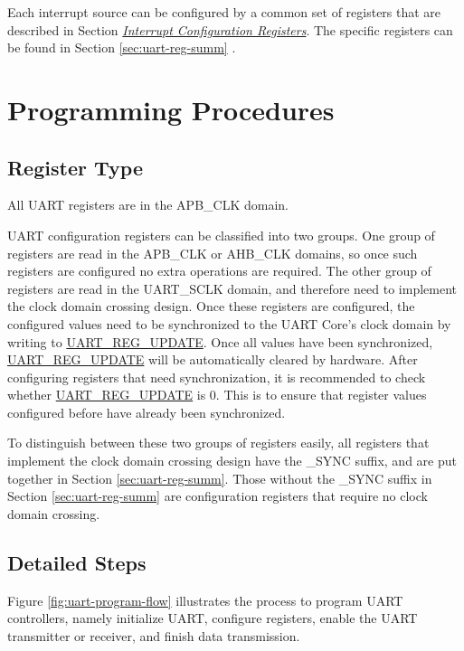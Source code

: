 \documentclass[main\_\_EN.tex]{subfiles}
\begin{document}
Each interrupt source can be configured by a common set of registers that are described in Section \hyperref[interrupt-config-registers]{\textit{Interrupt Configuration Registers}}. The specific registers can be found in Section \ref{sec:uart-reg-summ} \textit{}.


\section{Programming Procedures}\label{sec:uart-program}

\subsection{Register Type}

All UART registers are in the APB\_CLK domain.

UART configuration registers can be classified into two groups. One group of registers are read in the APB\_CLK or AHB\_CLK domains, so once such registers are configured no extra operations are required. The other group of registers are read in the UART\_SCLK domain, and therefore need to implement the clock domain crossing design. Once these registers are configured, the configured values need to be synchronized to the UART Core's clock domain by writing to \hyperref[fielddesc:UARTREGUPDATE]{UART\_REG\_UPDATE}. Once all values have been synchronized, \hyperref[fielddesc:UARTREGUPDATE]{UART\_REG\_UPDATE} will be automatically cleared by hardware. After configuring registers that need synchronization, it is recommended to check whether \hyperref[fielddesc:UARTREGUPDATE]{UART\_REG\_UPDATE} is 0. This is to ensure that register values configured before have already been synchronized.

To distinguish between these two groups of registers easily, all registers that implement the clock domain crossing design have the \_SYNC suffix, and are put together in Section \ref{sec:uart-reg-summ}. Those without the \_SYNC suffix in Section \ref{sec:uart-reg-summ} are configuration registers that require no clock domain crossing.

\clearpage
\subsection{Detailed Steps}

Figure \ref{fig:uart-program-flow} illustrates the process to program UART controllers, namely initialize UART, configure registers, enable the UART transmitter or receiver, and finish data transmission.
\end{document}
